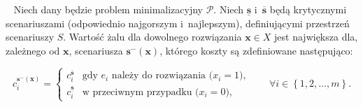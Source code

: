 \begin{theorem}\label{th:intminmaxreg}~\cite[$431$]{minmaxSurvey}
	Niech dany będzie problem minimalizacyjny $\mathcal{P}$.
	Niech $\underline{\textbf{s}}$ i~$\overline{\textbf{s}}$ będą krytycznymi scenariuszami (odpowiednio najgorszym i~najlepszym), definiującymi przestrzeń scenariuszy $S$.
	Wartość żalu dla dowolnego rozwiązania $\textbf{x} \in X$ jest największa dla, zależnego od $\textbf{x}$, scenariusza $\textbf{s}^{-} \left( \textbf{x} \right)$, którego koszty są zdefiniowane następująco:
	
	\begin{equation}
		c^{\textbf{s}^{-} \left( \textbf{x} \right)}_{i} = \left\{\begin{matrix}
			c^{\overline{\textbf{s}}}_{i} & \text{gdy $e_{i}$ należy do rozwiązania ($x_{i} = 1$),}\\ 
			c^{\underline{\textbf{s}}}_{i} &  \text{w przeciwnym przypadku ($x_{i} = 0$),}
		\end{matrix}\right. \qquad \forall i \in \left\{ 1, 2, \dots, m \right\}\text{.}
	\end{equation}
\end{theorem}

